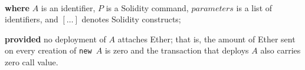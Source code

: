 \documentclass[11pt]{article}
\begin{document}
\begin{refactoring}[H]
\begin{footnotesize}
\mbox{}\\[1ex]

\noindent \textbf{where} $A$ is an identifier, $P$ is a Solidity command, $\mathit{parameters}$ is a list of identifiers, and $[\ldots]$ denotes Solidity constructs;

\noindent \textbf{provided} no deployment of $A$ attaches Ether; that is, the amount of Ether sent on every creation of \texttt{new }$A$ is zero and the transaction that deploys $A$ also carries zero call value.
\end{footnotesize}
\end{refactoring}
\end{document}
